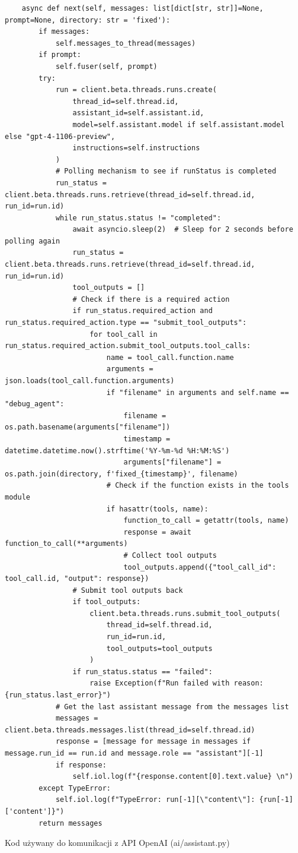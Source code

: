 \begin{listing}
\begin{verbatim}
    async def next(self, messages: list[dict[str, str]]=None, prompt=None, directory: str = 'fixed'):
        if messages:
            self.messages_to_thread(messages)
        if prompt:
            self.fuser(self, prompt)
        try:
            run = client.beta.threads.runs.create(
                thread_id=self.thread.id,
                assistant_id=self.assistant.id,
                model=self.assistant.model if self.assistant.model else "gpt-4-1106-preview",
                instructions=self.instructions
            )
            # Polling mechanism to see if runStatus is completed
            run_status = client.beta.threads.runs.retrieve(thread_id=self.thread.id, run_id=run.id)
            while run_status.status != "completed":
                await asyncio.sleep(2)  # Sleep for 2 seconds before polling again
                run_status = client.beta.threads.runs.retrieve(thread_id=self.thread.id, run_id=run.id)
                tool_outputs = []
                # Check if there is a required action
                if run_status.required_action and run_status.required_action.type == "submit_tool_outputs":
                    for tool_call in run_status.required_action.submit_tool_outputs.tool_calls:
                        name = tool_call.function.name
                        arguments = json.loads(tool_call.function.arguments)
                        if "filename" in arguments and self.name == "debug_agent": 
                            filename = os.path.basename(arguments["filename"])
                            timestamp = datetime.datetime.now().strftime('%Y-%m-%d %H:%M:%S')
                            arguments["filename"] = os.path.join(directory, f'fixed_{timestamp}', filename)
                        # Check if the function exists in the tools module
                        if hasattr(tools, name):
                            function_to_call = getattr(tools, name)
                            response = await function_to_call(**arguments)
                            # Collect tool outputs
                            tool_outputs.append({"tool_call_id": tool_call.id, "output": response})
                # Submit tool outputs back
                if tool_outputs:
                    client.beta.threads.runs.submit_tool_outputs(
                        thread_id=self.thread.id,
                        run_id=run.id,
                        tool_outputs=tool_outputs
                    )
                if run_status.status == "failed":
                    raise Exception(f"Run failed with reason: {run_status.last_error}")
            # Get the last assistant message from the messages list
            messages = client.beta.threads.messages.list(thread_id=self.thread.id)
            response = [message for message in messages if message.run_id == run.id and message.role == "assistant"][-1]
            if response:
                self.iol.log(f"{response.content[0].text.value} \n")
        except TypeError:
            self.iol.log(f"TypeError: run[-1][\"content\"]: {run[-1]['content']}")
        return messages
    \end{verbatim}
    \caption{Kod używany do komunikacji z API OpenAI (ai/assistant.py)}
    \label{lst:api_openai}
\end{listing}

